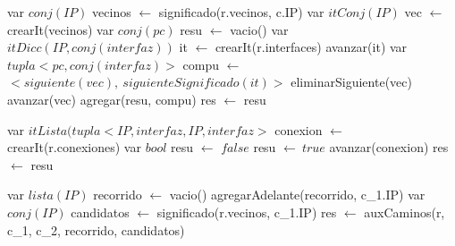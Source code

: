 \begin{algorithm}\phantom{[H]}
\begin{algorithmic}[1]
 
  \State var $conj(IP)$ vecinos $\gets$ significado(r.vecinos, c.IP)  
  \State var $itConj(IP)$ vec $\gets$ crearIt(vecinos)  
  \State var $conj(pc)$ resu $\gets$ vacio()  
     
      \State var $itDicc(IP,conj(interfaz))$ it $\gets$ crearIt(r.interfaces) 
       
      \State avanzar(it)  
      \EndWhile
    \State var $tupla<pc,conj(interfaz)>$ compu $\gets$ $< siguiente (vec),\ siguienteSignificado(it) >$ 
    \State eliminarSiguiente(vec) 
    \State avanzar(vec) 
    \State agregar(resu, compu) 
    \EndWhile
  \State res $\gets$ resu  
\EndFunction
\end{algorithmic}
\end{algorithm}

\begin{algorithm}\phantom{[H]}
\begin{algorithmic}[1]
 
  \State var $itLista(tupla<IP,interfaz,IP,interfaz>$ conexion $\gets$ crearIt(r.conexiones)   
  \State var $bool$ resu $\gets$ $false$  
   
     
      \State resu $\gets \ true$ 
    \Else
      \State avanzar(conexion)  
    \EndIf
  \EndWhile
  \State res $\gets$ resu 
\EndFunction
\end{algorithmic}
\end{algorithm}

\begin{algorithm}\phantom{[H]}
\begin{algorithmic}[1]
  
  \State var $lista(IP)$ recorrido $\gets$ vacio()   
  \State agregarAdelante(recorrido, c_{1}.IP) 
  \State var $conj(IP)$ candidatos $\gets$ significado(r.vecinos, c_{1}.IP) 
  \State res $\gets$ auxCaminos(r, c_{1}, c_{2}, recorrido, candidatos) 
\EndFunction
\end{algorithmic}
\end{algorithm}

